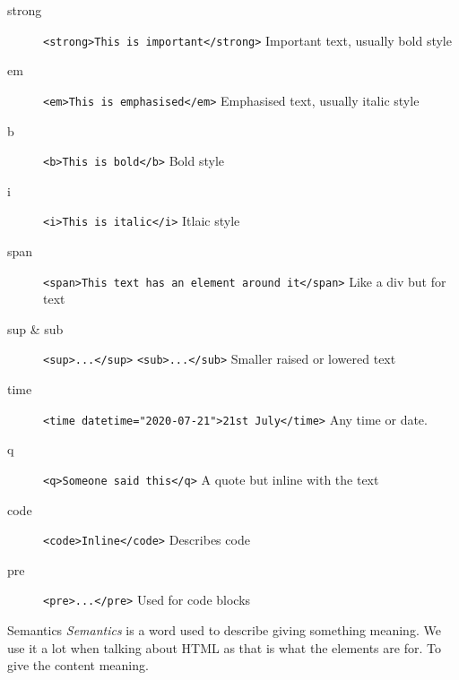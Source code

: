 \begin{description}
	\item[strong] \texttt{<strong>This is important</strong>} Important text, usually bold style
	\item[em] \texttt{<em>This is emphasised</em>} Emphasised text, usually italic style
	\item[b] \texttt{<b>This is bold</b>} Bold style
	\item[i] \texttt{<i>This is italic</i>} Itlaic style
	\item[span] \texttt{<span>This text has an element around it</span>} Like a div but for text
	\item[sup \& sub] \texttt{<sup>...</sup>} \texttt{<sub>...</sub>} Smaller raised or lowered text
	\item[time] \texttt{<time datetime="2020-07-21">21st July</time>} Any time or date.
	\item[q] \texttt{<q>Someone said this</q>} A quote but inline with the text
	\item[code] \texttt{<code>Inline</code>} Describes code
	\item[pre] \texttt{<pre>...</pre>} Used for code blocks
\end{description}

\begin{infobox}{Semantics}
    \textit{Semantics} is a word used to describe giving something meaning. We use it a lot when talking about HTML as that is what the elements are for. To give the content meaning.
\end{infobox}


